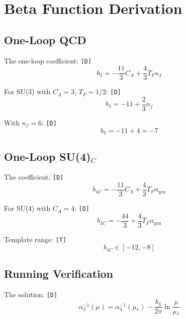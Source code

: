 \documentclass[11pt,a4paper]{article}
\newcommand{\tagD}{\textcolor{green!50!black}{\texttt{[D]}}}
\newcommand{\tagT}{\textcolor{cyan!70!black}{\texttt{[T]}}}
\theoremstyle{definition}
\begin{document}
\section{Beta Function Derivation}
\label{app:beta-deriv}

\subsection{One-Loop QCD}
\label{app:one-loop-qcd}

The one-loop coefficient: \tagD{}
\begin{equation}
\label{eq:beta-qcd-1}
b_3 = -\frac{11}{3}C_A + \frac{4}{3}T_F n_f
\end{equation}

For SU(3) with $C_A = 3$, $T_F = 1/2$: \tagD{}
\begin{equation}
\label{eq:beta-qcd-2}
b_3 = -11 + \frac{2}{3}n_f
\end{equation}

With $n_f = 6$: \tagD{}
\begin{equation}
\label{eq:beta-qcd-3}
b_3 = -11 + 4 = -7
\end{equation}

\subsection{One-Loop SU(4)$_C$}
\label{app:one-loop-su4}

The coefficient: \tagD{}
\begin{equation}
\label{eq:beta-su4-1}
b_{4C} = -\frac{11}{3}C_A + \frac{4}{3}T_F n_{\text{gen}}
\end{equation}

For SU(4) with $C_A = 4$: \tagD{}
\begin{equation}
\label{eq:beta-su4-2}
b_{4C} = -\frac{44}{3} + \frac{4}{3}T_F n_{\text{gen}}
\end{equation}

Template range: \tagT{}
\begin{equation}
\label{eq:beta-su4-3}
b_{4C} \in [-12, -8]
\end{equation}

\subsection{Running Verification}
\label{app:run-verify}

The solution: \tagD{}
\begin{equation}
\label{eq:run-sol}
\alpha_3^{-1}(\mu) = \alpha_3^{-1}(\mu_*) - \frac{b_3}{2\pi}\ln\frac{\mu}{\mu_*}
\end{equation}
\end{document}

